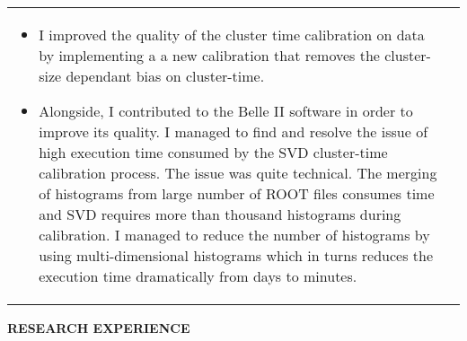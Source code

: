 \documentclass[12pt]{article}
\begin{document}
\begin{minipage}{1.05\textwidth}
\begin{tabular}{p{2.5cm} p{14.5cm} }
\begin{itemize}
  \item I improved the quality of the cluster time calibration on data by implementing a
    a new calibration that removes the cluster-size dependant bias on cluster-time.

  \item Alongside, I contributed to the Belle II software in order to improve its quality.
    I managed to find and resolve the issue of high execution time consumed by
    the SVD cluster-time calibration process. The issue was quite technical.
    The merging of histograms from large number of ROOT files consumes time and
    SVD requires more than thousand histograms during calibration.
    I managed to reduce the number of histograms by using multi-dimensional
    histograms which in turns reduces
    the execution time dramatically from days to minutes.
  \end{itemize}

\end{tabular}
\end{minipage}

\pagebreak
\vspace{0.5cm}
\colorbox{gray!40}{\begin{minipage}{17.5cm}
\bf {RESEARCH EXPERIENCE } 
\end{minipage} }
\end{document}
